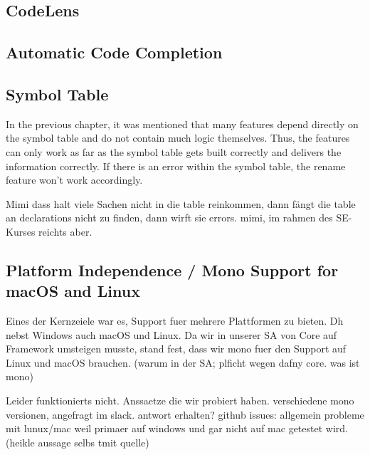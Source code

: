 \subsection{CodeLens}

\subsection{Automatic Code Completion}

\subsection{Symbol Table}
In the previous chapter, it was mentioned that many features depend directly on the symbol table and do not contain much logic themselves.
Thus, the features can only work as far as the symbol table gets built correctly and delivers the information correctly.
If there is an error within the symbol table, the rename feature won't work accordingly.

Mimi dass halt viele Sachen nicht in die table reinkommen, dann fängt die table an declarations nicht zu finden, dann wirft sie errors.
mimi, im rahmen des SE-Kurses reichts aber.



\subsection{Platform Independence / Mono Support for macOS and Linux}
Eines der Kernzeiele war es, Support fuer mehrere Plattformen zu bieten. Dh nebst Windows auch macOS und Linux.
Da wir in unserer SA von Core auf Framework umsteigen musste, stand fest, dass wir mono fuer den Support auf Linux und macOS brauchen.
(warum in der SA; plficht wegen dafny core. was ist mono)

Leider funktionierts nicht.
Anssaetze die wir probiert haben. verschiedene mono versionen, angefragt im slack. antwort erhalten?
github issues: allgemein probleme mit lunux/mac weil primaer auf windows und gar nicht auf mac getestet wird. (heikle aussage selbs tmit quelle)

\cite{sa}
\cite{mono-slack}
\cite{mono-git}
